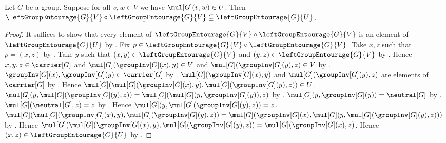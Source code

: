 \begin{proposition}\label{left_group_entourage_square}
    Let $G$ be a group.
    Suppose for all $v,w\in V$ we have $\mul[G](v,w)\in U$.
    Then $\leftGroupEntourage{G}{V}
        \circ\leftGroupEntourage{G}{V}
        \subseteq\leftGroupEntourage{G}{U}$.
\end{proposition}
\begin{proof}
    It suffices to show that every element of
        $\leftGroupEntourage{G}{V}\circ\leftGroupEntourage{G}{V}$
        is an element of $\leftGroupEntourage{G}{U}$ by .
    Fix $p\in
        \leftGroupEntourage{G}{V}\circ\leftGroupEntourage{G}{V}$.
    Take $x,z$ such that $p=(x,z)$ by .
    Take $y$ such that
        $(x,y)\in\leftGroupEntourage{G}{V}$ and
        $(y,z)\in\leftGroupEntourage{G}{V}$ by .
    Hence $x,y,z\in\carrier[G]$ and
        $\mul[G](\groupInv[G](x),y)\in V$ and
        $\mul[G](\groupInv[G](y),z)\in V$
        by .
    $\groupInv[G](x),\groupInv[G](y)\in\carrier[G]$
        by .
    $\mul[G](\groupInv[G](x),y)$ and
        $\mul[G](\groupInv[G](y),z)$ are elements of $\carrier[G]$
        by .
    Hence
        $\mul[G](\mul[G](\groupInv[G](x),y),
            \mul[G](\groupInv[G](y),z))\in U$.
    $\mul[G](y,\mul[G](\groupInv[G](y),z))
        =\mul[G](\mul[G](y,\groupInv[G](y)),z)$
        by .
    $\mul[G](y,\groupInv[G](y))=\neutral[G]$
        by .
    $\mul[G](\neutral[G],z)=z$ by .
    Hence $\mul[G](y,\mul[G](\groupInv[G](y),z))=z$.
    $\mul[G](\mul[G](\groupInv[G](x),y),
            \mul[G](\groupInv[G](y),z))
        =\mul[G](\groupInv[G](x),
            \mul[G](y,\mul[G](\groupInv[G](y),z)))$
        by .
    Hence $\mul[G](\mul[G](\groupInv[G](x),y),
            \mul[G](\groupInv[G](y),z))
        =\mul[G](\groupInv[G](x),z)$.
    Hence $(x,z)\in\leftGroupEntourage{G}{U}$
        by .
\end{proof}

